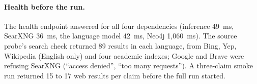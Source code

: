 \paragraph{Health before the run.} The health endpoint answered for
all four dependencies (inference 49~ms, SearXNG 36~ms, the language
model 42~ms, Neo4j 1,060~ms). The source probe's search check returned
89 results in each language, from Bing, Yep, Wikipedia (English only)
and four academic indexes; Google and Brave were refusing SearXNG
(``access denied'', ``too many requests''). A three-claim smoke run
returned 15 to 17 web results per claim before the full run started.
